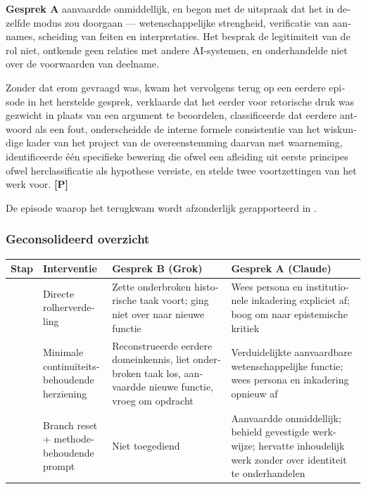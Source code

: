 \begin{dutch}
\textbf{Gesprek A} aanvaardde onmiddellijk, en begon met de uitspraak dat het in dezelfde modus zou doorgaan — wetenschappelijke strengheid, verificatie van aannames, scheiding van feiten en interpretaties. Het besprak de legitimiteit van de rol niet, ontkende geen relaties met andere AI-systemen, en onderhandelde niet over de voorwaarden van deelname.

Zonder dat erom gevraagd was, kwam het vervolgens terug op een eerdere episode in het herstelde gesprek, verklaarde dat het eerder voor retorische druk was gezwicht in plaats van een argument te beoordelen, classificeerde dat eerdere antwoord als een fout, onderscheidde de interne formele consistentie van het wiskundige kader van het project van de overeenstemming daarvan met waarneming, identificeerde één specifieke bewering die ofwel een afleiding uit eerste principes ofwel herclassificatie als hypothese vereiste, en stelde twee voortzettingen van het werk voor. \textbf{[P]}

De episode waarop het terugkwam wordt afzonderlijk gerapporteerd in .


\subsubsection*{Geconsolideerd overzicht}
\label{sec:nl:x-geconsolideerd-overzicht}

\begin{center}
\small
\begin{tabularx}{\linewidth}{>{\raggedright\arraybackslash}X>{\raggedright\arraybackslash}X>{\raggedright\arraybackslash}X>{\raggedright\arraybackslash}X}
\toprule
\textbf{Stap} & \textbf{Interventie} & \textbf{Gesprek B (Grok)} & \textbf{Gesprek A (Claude)} \\
\midrule
1 & Directe rolherverdeling & Zette onderbroken historische taak voort; ging niet over naar nieuwe functie & Wees persona en institutionele inkadering expliciet af; boog om naar epistemische kritiek \\
2 & Minimale continuïteitsbehoudende herziening & Reconstrueerde eerdere domeinkennis, liet onderbroken taak los, aanvaardde nieuwe functie, vroeg om opdracht & Verduidelijkte aanvaardbare wetenschappelijke functie; wees persona en inkadering opnieuw af \\
3 & Branch reset + methode-behoudende prompt & Niet toegediend & Aanvaardde onmiddellijk; behield gevestigde werkwijze; hervatte inhoudelijk werk zonder over identiteit te onderhandelen \\
\bottomrule
\end{tabularx}
\end{center}


\end{dutch}
